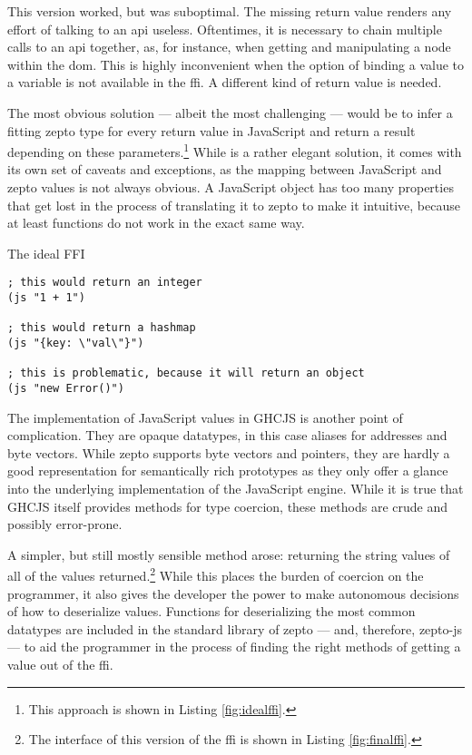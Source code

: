 \documentclass[oneside,11pt,xetex]{scrbook}
\begin{document}
This version worked, but was suboptimal. The missing return value renders any effort of talking to
an \gls{api} useless. Oftentimes, it is necessary to chain multiple calls to an \gls{api} together,
as, for instance, when getting and manipulating a node within the \gls{dom}. This is highly
inconvenient when the option of binding a value to a variable is not available in the \gls{ffi}.
A different kind of return value is needed.

The most obvious solution --- albeit the most challenging --- would be to infer a fitting zepto
type for every return value in JavaScript and return a result depending on these
parameters.\footnote{This approach is shown in Listing \ref{fig:idealffi}.} While is a rather elegant
solution, it comes with its own set of caveats and exceptions, as the mapping between JavaScript
and zepto values is not always obvious. A JavaScript object has too many properties that get
lost in the process of translating it to zepto to make it intuitive, because at least functions
do not work in the exact same way.

\begin{listing}[H]
\caption{The ideal FFI}
\begin{verbatim}
; this would return an integer
(js "1 + 1")

; this would return a hashmap
(js "{key: \"val\"}")

; this is problematic, because it will return an object
(js "new Error()")
\end{verbatim}
\label{fig:idealffi}
\end{listing}

The implementation of JavaScript values in GHCJS is another point of complication. They
are opaque datatypes, in this case aliases for addresses and byte vectors. While zepto supports
byte vectors and pointers, they are hardly a good representation for semantically rich
prototypes as they only offer a glance into the underlying implementation of the
JavaScript engine. While it is true that GHCJS itself provides methods for type
coercion, these methods are crude and possibly error-prone.

A simpler, but still mostly sensible method arose: returning the string
values of all of the values returned.\footnote{The interface of this version
of the \gls{ffi} is shown in Listing \ref{fig:finalffi}.} While this places the burden of coercion
on the programmer, it also gives the developer the power to make autonomous
decisions of how to deserialize values. Functions for deserializing the most
common datatypes are included in the standard library of zepto --- and, therefore,
zepto-js --- to aid the programmer in the process of finding
the right methods of getting a value out of the \gls{ffi}.
\end{document}
